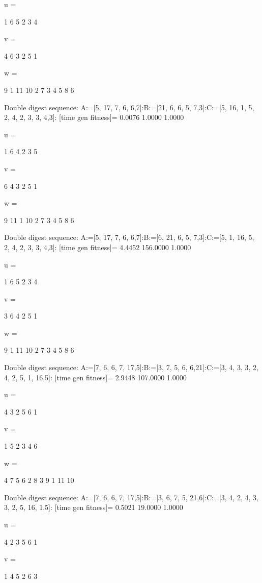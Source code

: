 u =

     1     6     5     2     3     4


v =

     4     6     3     2     5     1


w =

     9     1    11    10     2     7     3     4     5     8     6

Double digest sequence:
A:=[5, 17, 7, 6, 6,7]:B:=[21, 6, 6, 5, 7,3]:C:=[5, 16, 1, 5, 2, 4, 2, 3, 3, 4,3]:
[time gen fitness]=
    0.0076    1.0000    1.0000


u =

     1     6     4     2     3     5


v =

     6     4     3     2     5     1


w =

     9    11     1    10     2     7     3     4     5     8     6

Double digest sequence:
A:=[5, 17, 7, 6, 6,7]:B:=[6, 21, 6, 5, 7,3]:C:=[5, 1, 16, 5, 2, 4, 2, 3, 3, 4,3]:
[time gen fitness]=
    4.4452  156.0000    1.0000


u =

     1     6     5     2     3     4


v =

     3     6     4     2     5     1


w =

     9     1    11    10     2     7     3     4     5     8     6

Double digest sequence:
A:=[7, 6, 6, 7, 17,5]:B:=[3, 7, 5, 6, 6,21]:C:=[3, 4, 3, 3, 2, 4, 2, 5, 1, 16,5]:
[time gen fitness]=
    2.9448  107.0000    1.0000


u =

     4     3     2     5     6     1


v =

     1     5     2     3     4     6


w =

     4     7     5     6     2     8     3     9     1    11    10

Double digest sequence:
A:=[7, 6, 6, 7, 17,5]:B:=[3, 6, 7, 5, 21,6]:C:=[3, 4, 2, 4, 3, 3, 2, 5, 16, 1,5]:
[time gen fitness]=
    0.5021   19.0000    1.0000


u =

     4     2     3     5     6     1


v =

     1     4     5     2     6     3


